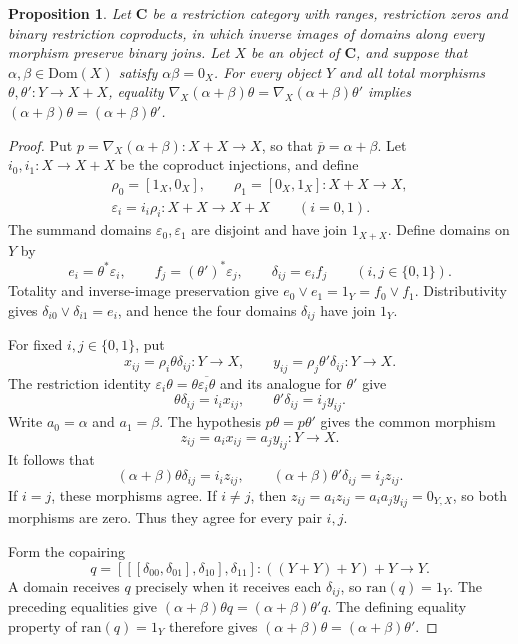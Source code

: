\documentclass[letterpaper,10pt]{amsart}
\theoremstyle{plain}
\newtheorem{prop}[thm]{Proposition}
\theoremstyle{definition}
\newcommand{\rst}[1]{\overline{#1}}
\begin{document}
\begin{prop}\label{PropTotalCopMono}
Let $\mathbf C$ be a restriction category with ranges, restriction
zeros and binary restriction coproducts, in which inverse images of
domains along every morphism preserve binary joins. Let $X$ be an
object of $\mathbf C$, and suppose that $\alpha,\beta\in\mathrm{Dom}(X)$ satisfy $\alpha\beta=0_X$.
For every object $Y$ and all total morphisms $\theta,\theta':Y\to X+X$, equality
$\nabla_X(\alpha+\beta)\theta=\nabla_X(\alpha+\beta)\theta'$
implies $(\alpha+\beta)\theta=(\alpha+\beta)\theta'$.
\end{prop}
\begin{proof}
Put $p=\nabla_X(\alpha+\beta):X+X\to X$, so that
$\rst p=\alpha+\beta$. Let $i_0,i_1:X\to X+X$ be the coproduct
injections, and define
\[
 \begin{gathered}
 \rho_0=[1_X,0_X],\qquad \rho_1=[0_X,1_X]:X+X\to X,\\
 \varepsilon_i=i_i\rho_i:X+X\to X+X\qquad(i=0,1).
 \end{gathered}
\]
The summand domains $\varepsilon_0,\varepsilon_1$ are disjoint
and have join $1_{X+X}$. Define domains on $Y$ by
\[
 e_i=\theta^*\varepsilon_i,\qquad
 f_j=(\theta')^*\varepsilon_j,\qquad
 \delta_{ij}=e_i f_j\qquad(i,j\in\{0,1\}).
\]
Totality and inverse-image preservation give
$e_0\vee e_1=1_Y=f_0\vee f_1$. Distributivity gives
$\delta_{i0}\vee\delta_{i1}=e_i$, and hence the four domains
$\delta_{ij}$ have join $1_Y$.

For fixed $i,j\in\{0,1\}$, put
\[
 x_{ij}=\rho_i\theta\delta_{ij}:Y\to X,
 \qquad y_{ij}=\rho_j\theta'\delta_{ij}:Y\to X.
\]
The restriction identity
$\varepsilon_i\theta=\theta\rst{\varepsilon_i\theta}$ and its
analogue for $\theta'$ give
\[
 \theta\delta_{ij}=i_i x_{ij},\qquad
 \theta'\delta_{ij}=i_j y_{ij}.
\]
Write $a_0=\alpha$ and $a_1=\beta$. The hypothesis $p\theta=p\theta'$
gives the common morphism
\[
 z_{ij}=a_i x_{ij}=a_j y_{ij}:Y\to X.
\]
It follows that
\[
 (\alpha+\beta)\theta\delta_{ij}=i_i z_{ij},\qquad
 (\alpha+\beta)\theta'\delta_{ij}=i_j z_{ij}.
\]
If $i=j$, these morphisms agree. If $i\ne j$, then
$z_{ij}=a_i z_{ij}=a_i a_j y_{ij}=0_{Y,X}$, so both morphisms
are zero. Thus they agree for every pair $i,j$.

Form the copairing
\[
 q=[[[\delta_{00},\delta_{01}],\delta_{10}],\delta_{11}]
       :((Y+Y)+Y)+Y\longrightarrow Y.
\]
A domain receives $q$ precisely when it receives each $\delta_{ij}$,
so $\mathrm{ran}(q)=1_Y$. The preceding equalities give
$(\alpha+\beta)\theta q=(\alpha+\beta)\theta' q$.
The defining equality property of $\mathrm{ran}(q)=1_Y$ therefore gives
$(\alpha+\beta)\theta=(\alpha+\beta)\theta'$.
\end{proof}
\end{document}
